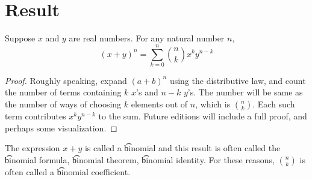 
\section*{Result}

\begin{proposition}
Suppose $x$ and $y$ are real numbers.
For any natural number $n$,
\[
(x+y)^n = \sum_{k = 0}^{n} {n \choose k} x^{k}y^{n-k}
\]
\begin{proof}Roughly speaking, expand $(a+b)^n$ using the distributive law, and count the number of terms containing $k$ $x$'s and $n-k$ $y$'s.
The number will be same as the number of ways of choosing $k$ elements out of $n$, which is ${n \choose k}$.
Each such term contributes $x^ky^{n-k}$ to the sum.
Future editions will include a full proof, and perhaps some visualization.\end{proof}
\end{proposition}

The expression $x+y$ is called a \t{binomial} and this result is often called the \t{binomial formula}, \t{binomial theorem}, \t{binomial identity}.
For these reasons, ${n \choose k}$ is often called a \t{binomial coefficient}.

\blankpage